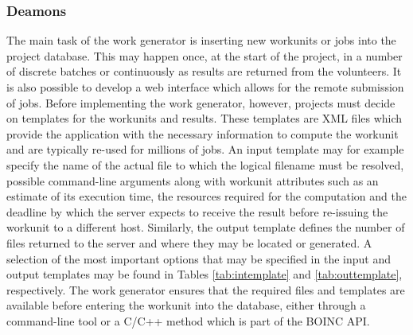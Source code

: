 \subsubsection{Deamons} \label{Bdeamons}
The main task of the work generator is inserting new workunits or jobs into the project database. This may happen once, at the start of the project, in a number of discrete batches or continuously as results are returned from the volunteers. It is also possible to develop a web interface which allows for the remote submission of jobs.
Before implementing the work generator, however, projects must decide on templates for the workunits and results. These templates are XML files which provide  the application with the necessary information to compute the workunit and are typically re-used for millions of jobs. 
An input template may for example specify the name of the actual file to which the logical filename must be resolved, possible command-line arguments along with workunit attributes such as an estimate of its execution time, the resources required for the computation and the deadline by which the server expects to receive the result before re-issuing the workunit to a different host.  
Similarly, the output template defines the number of files returned to the server and where they may be located  or generated. A selection of the most important options that may be specified in the input and output templates may be found in Tables \ref{tab:intemplate} and \ref{tab:outtemplate}, respectively. The work generator ensures that the required files and templates are available before entering the workunit into the database, either through a command-line tool or  a C/C++ method which is part of the BOINC API.
